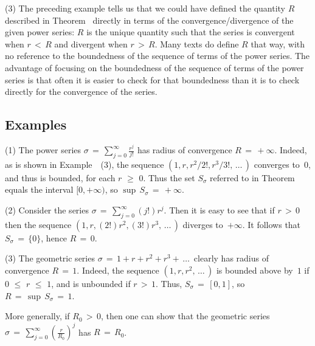 \V

        (3) The preceding example tells us that we could have defined the quantity $R$ described in Theorem~ directly in terms of the convergence/divergence of the given power series:
    $R$ is the unique quantity such that the series is convergent when $r\,<\,R$ and divergent when $r\,>\,R$.
    Many texts do define $R$ that way, with no reference to the boundedness of the sequence of terms of the power series.
    The advantage of focusing on the boundedness of the sequence of terms of the power series is that often it is easier to check for that boundedness than it is to check directly for the convergence of the series.


\V
\V


        \subsection{\small{{\bf Examples}}}
        \label{ExampG50.50}

\V

\hspace*{\parindent}(1) The power series ${\sigma} \,=\, {\displaystyle \sum_{j=0}^{{\infty}} \frac{r^{j}}{j!}}$ has radius of convergence $R \,=\, +{\infty}$.
    Indeed, as is shown in Example~~(3), the sequence $(1, r, r^{2}/2!, r^{3}/3!, \,{\ldots}\,)$ converges to~$0$, and thus is bounded, for each $r\,\,{\geq}\,\,0$.
    Thus the set $S_{{\sigma}}$ referred to in Theorem~ equals the interval $[0,+{\infty})$, so ${\sup}\,S_{{\sigma}} \,=\, +{\infty}$.

\V

        (2) Consider the series ${\sigma} \,=\, \sum_{j=0}^{{\infty}} (j!)r^{j}$. Then it is easy to see that if $r\,>\,0$ then the sequence $(1, r, (2!)r^{2}, (3!)r^{3},\,{\ldots}\,)$ diverges to~$+{\infty}$.
    It follows that $S_{{\sigma}} \,=\, \{0\}$, hence $R \,=\, 0$.

\V

        (3) The geometric series ${\sigma} \,=\, 1+r+r^{2} + r^{3}+ \,{\ldots}\,$ clearly has radius of convergence $R \,=\, 1$.
    Indeed, the sequence $(1,r,r^{2},\,{\ldots}\,)$ is bounded above by~$1$ if $0\,\,{\leq}\,\,r\,\,{\leq}\,\,1$, and is unbounded if $r\,>\,1$.
    Thus, $S_{{\sigma}} \,=\, [0,1]$, so $R \,=\, {\sup}\,S_{{\sigma}} \,=\, 1$.

        More generally, if $R_{0}\,>\,0$, then one can show that the geometric series ${\displaystyle {\sigma} \,=\, \sum_{j=0}^{{\infty}} \left(\frac{r}{R_{0}}\right)^{j}}$ has $R \,=\, R_{0}$.

